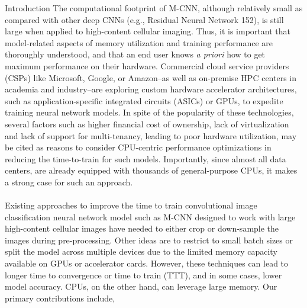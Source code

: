 \begin{section}{Introduction}
\noindent The computational footprint of M-CNN, although relatively small as compared with other deep CNNs (e.g., Residual Neural Network 152), is still large when applied to high-content cellular imaging. Thus, it is important that model-related aspects of memory utilization and training performance are thoroughly understood, and that an end user knows \emph{a priori} how to get maximum performance on their hardware. Commercial cloud service providers (CSPs) like Microsoft, Google, or Amazon--as well as on-premise HPC centers in academia and industry--are exploring custom hardware accelerator architectures, such as application-specific integrated circuits (ASICs) \cite{jouppi2017} or GPUs, to expedite training neural network models. In spite of the popularity of these technologies, several factors such as higher financial cost of ownership, lack of virtualization and lack of support for multi-tenancy, leading to poor hardware utilization, may be cited as reasons to consider CPU-centric performance optimizations in reducing the time-to-train for such models. Importantly, since almost all data centers, are already equipped with thousands of general-purpose CPUs, it makes a strong case for such an approach. \\\\
\noindent Existing approaches to improve the time to train convolutional image classification neural network model such as M-CNN designed to work with large high-content cellular images have needed to either crop or down-sample the images during pre-processing. Other ideas are to restrict to small batch sizes or split the model across multiple devices due to the limited memory capacity available on GPUs or accelerator cards. However, these techniques can lead to longer time to convergence or time to train (TTT), and in some cases, lower model accuracy. CPUs, on the other hand, can leverage large memory. Our primary contributions include,


\end{section}
